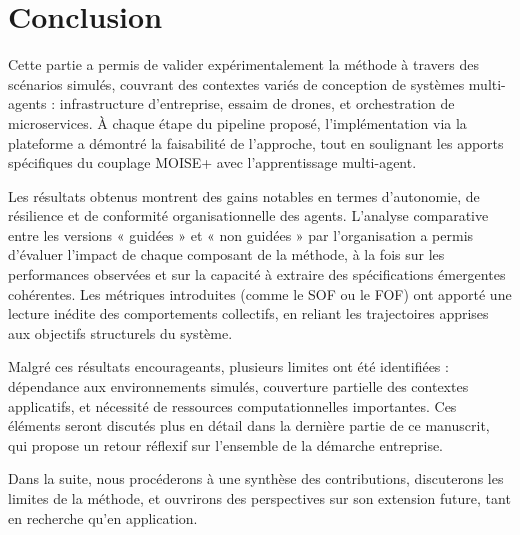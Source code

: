\clearpage
\thispagestyle{empty}
\null
\newpage


\chapter*{Conclusion}

Cette partie a permis de valider expérimentalement la méthode  à travers des scénarios simulés, couvrant des contextes variés de conception de systèmes multi-agents : infrastructure d’entreprise, essaim de drones, et orchestration de microservices. À chaque étape du pipeline proposé, l’implémentation via la plateforme  a démontré la faisabilité de l’approche, tout en soulignant les apports spécifiques du couplage MOISE+ avec l’apprentissage multi-agent.

Les résultats obtenus montrent des gains notables en termes d’autonomie, de résilience et de conformité organisationnelle des agents. L’analyse comparative entre les versions « guidées » et « non guidées » par l’organisation a permis d’évaluer l’impact de chaque composant de la méthode, à la fois sur les performances observées et sur la capacité à extraire des spécifications émergentes cohérentes. Les métriques introduites (comme le SOF ou le FOF) ont apporté une lecture inédite des comportements collectifs, en reliant les trajectoires apprises aux objectifs structurels du système.

Malgré ces résultats encourageants, plusieurs limites ont été identifiées : dépendance aux environnements simulés, couverture partielle des contextes applicatifs, et nécessité de ressources computationnelles importantes. Ces éléments seront discutés plus en détail dans la dernière partie de ce manuscrit, qui propose un retour réflexif sur l’ensemble de la démarche entreprise.

\vspace{1em}

\noindent
Dans la suite, nous procéderons à une synthèse des contributions, discuterons les limites de la méthode, et ouvrirons des perspectives sur son extension future, tant en recherche qu’en application.
